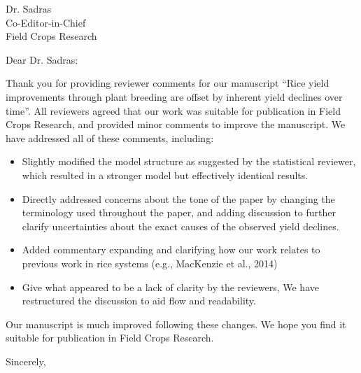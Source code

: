 \documentclass{letter}
\begin{document}
\begin{letter}{Dr. Sadras \\
Co-Editor-in-Chief \\
Field Crops Research}
\opening{Dear Dr. Sadras:}

Thank you for providing reviewer comments for our manuscript ``Rice
yield improvements through plant breeding are offset by inherent yield
declines over time''. All reviewers agreed that our work was suitable
for publication in Field Crops Research, and provided minor comments
to improve the manuscript. We have addressed all of these comments, including:

\begin{itemize}
\item{Slightly modified the model structure as suggested by the
  statistical reviewer, which resulted in a stronger model but
  effectively identical results.}
\item{Directly addressed concerns about the tone of the paper by
  changing the terminology used throughout the paper, and adding
  discussion to further clarify uncertainties about the exact causes
  of the observed yield declines.}
\item{Added commentary expanding and clarifying how our work relates
  to previous work in rice systems (e.g., MacKenzie et al., 2014)}
\item{Give what appeared to be a lack of clarity by the reviewers, We
  have restructured the discussion to aid flow and readability.}
\end{itemize}

Our manuscript is much improved following these changes. We hope you
find it suitable for publication in Field Crops Research.

\closing{Sincerely,}
\end{letter}
\end{document}
